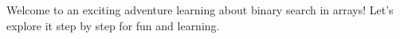 \documentclass[preview]{standalone}
\begin{document}
\begin{center}
Welcome to an exciting adventure learning about binary search in arrays! Let’s explore it step by step for fun and learning.
\end{center}
\end{document}
